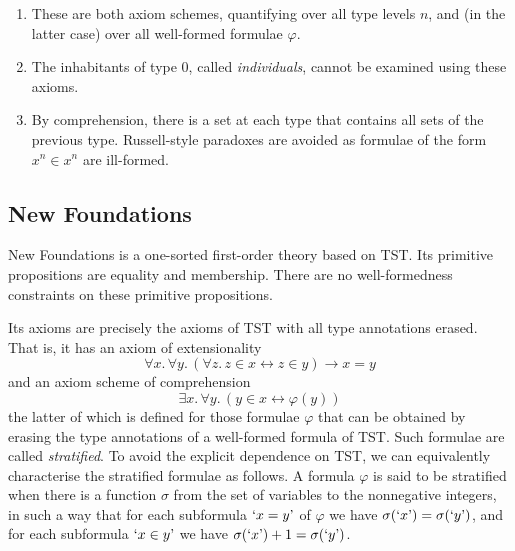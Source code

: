 \begin{remarks}
	\begin{enumerate}
		\item These are both axiom schemes, quantifying over all type levels \( n \), and (in the latter case) over all well-formed formulae \( \varphi \).
		\item The inhabitants of type 0, called \emph{individuals}, cannot be examined using these axioms.
		\item By comprehension, there is a set at each type that contains all sets of the previous type.
		Russell-style paradoxes are avoided as formulae of the form \( x^n \in x^n \) are ill-formed.
	\end{enumerate}
\end{remarks}

\subsection{New Foundations}

New Foundations is a one-sorted first-order theory based on TST.
Its primitive propositions are equality and membership.
There are no well-formedness constraints on these primitive propositions.

Its axioms are precisely the axioms of TST with all type annotations erased.
That is, it has an axiom of extensionality
\[ \forall x.\, \forall y.\, (\forall z.\, z \in x \leftrightarrow z \in y) \to x = y \]
and an axiom scheme of comprehension
\[ \exists x.\, \forall y.\, (y \in x \leftrightarrow \varphi(y)) \]
the latter of which is defined for those formulae \( \varphi \) that can be obtained by erasing the type annotations of a well-formed formula of TST.
Such formulae are called \emph{stratified}.
To avoid the explicit dependence on TST, we can equivalently characterise the stratified formulae as follows.
A formula \( \varphi \) is said to be stratified when there is a function \( \sigma \) from the set of variables to the nonnegative integers, in such a way that for each subformula \( \text{`}x = y\text{'} \) of \( \varphi \) we have \( \sigma(\text{`}x\text{'}) = \sigma(\text{`}y\text{'}) \), and for each subformula \( \text{`}x \in y\text{'} \) we have \( \sigma(\text{`}x\text{'}) + 1 = \sigma(\text{`}y\text{'}) \).

